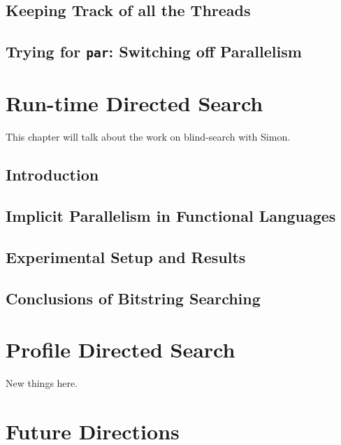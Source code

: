 \documentclass[justified, twoside, a4paper, symmetric]{tufte-book}
\begin{document}
    \section{Keeping Track of all the Threads}
    \label{sec:logging}
    

    \section{Trying for \texttt{par}: Switching off Parallelism}
    \label{sec:parSwitching}
    

\chapter{Run-time Directed Search}

    This chapter will talk about the work on blind-search with Simon.

    \section{Introduction}
    

    \section{Implicit Parallelism in Functional Languages}
    \label{sec:blind-ParFunc}
    

    \section{Experimental Setup and Results}
    \label{sec:blind-Results}
    

    \section{Conclusions of Bitstring Searching}
    \label{sec:blind-Conclusion}
    

\chapter{Profile Directed Search}

    New things here.
    \label{sec:informed-search}
    


\chapter{Future Directions}
\end{document}
